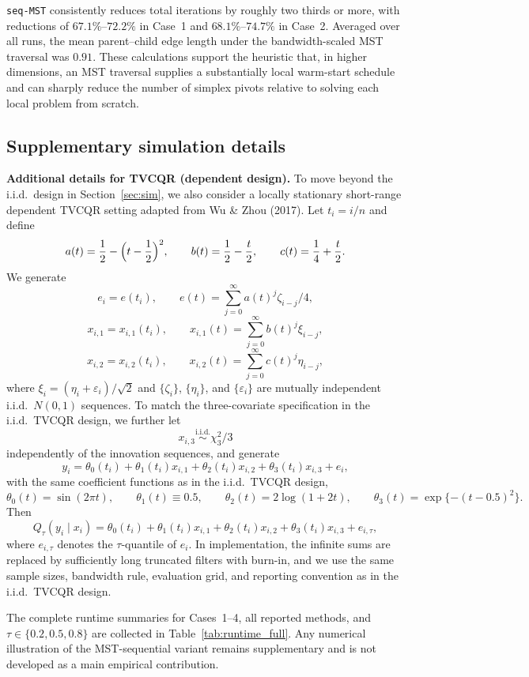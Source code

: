 \documentclass[lineno]{biometrika}
\begin{document}
\texttt{seq-MST} consistently reduces total iterations by roughly two thirds or more, with reductions of
$67.1\%$--$72.2\%$ in Case~1 and $68.1\%$--$74.7\%$ in Case~2. Averaged over all runs, the mean parent--child edge
length under the bandwidth-scaled MST traversal was $0.91$. These calculations support the heuristic that, in higher
dimensions, an MST traversal supplies a substantially local warm-start schedule and can sharply reduce the number of
simplex pivots relative to solving each local problem from scratch.

\subsection{Supplementary simulation details}\label{app:supplement}

\noindent\textbf{Additional details for TVCQR (dependent design).}
To move beyond the i.i.d.\ design in Section~\ref{sec:sim}, we also consider a locally stationary short-range
dependent TVCQR setting adapted from Wu \& Zhou (2017). Let $t_i=i/n$ and define
\[
a(t)=\frac{1}{2}-\Bigl(t-\frac{1}{2}\Bigr)^2,\qquad
b(t)=\frac{1}{2}-\frac{t}{2},\qquad
c(t)=\frac{1}{4}+\frac{t}{2}.
\]
We generate
\[
e_i=e(t_i),\qquad e(t)=\sum_{j=0}^\infty a(t)^j\zeta_{i-j}/4,
\]
\[
x_{i,1}=x_{i,1}(t_i),\qquad x_{i,1}(t)=\sum_{j=0}^\infty b(t)^j\xi_{i-j},
\]
\[
x_{i,2}=x_{i,2}(t_i),\qquad x_{i,2}(t)=\sum_{j=0}^\infty c(t)^j\eta_{i-j},
\]
where $\xi_i=(\eta_i+\varepsilon_i)/\sqrt{2}$ and $\{\zeta_i\}$, $\{\eta_i\}$, and $\{\varepsilon_i\}$ are mutually
independent i.i.d.\ $N(0,1)$ sequences. To match the three-covariate specification in the i.i.d.\ TVCQR design, we further let
\[
x_{i,3}\stackrel{\mathrm{i.i.d.}}{\sim}\chi_3^2/3
\]
independently of the innovation sequences, and generate
\[
y_i=\theta_0(t_i)+\theta_1(t_i)x_{i,1}+\theta_2(t_i)x_{i,2}+\theta_3(t_i)x_{i,3}+e_i,
\]
with the same coefficient functions as in the i.i.d.\ TVCQR design,
\[
\theta_0(t)=\sin(2\pi t),\qquad
\theta_1(t)\equiv 0.5,\qquad
\theta_2(t)=2\log(1+2t),\qquad
\theta_3(t)=\exp\{-(t-0.5)^2\}.
\]
Then
\[
Q_\tau(y_i\mid x_i)=\theta_0(t_i)+\theta_1(t_i)x_{i,1}+\theta_2(t_i)x_{i,2}+\theta_3(t_i)x_{i,3}+e_{i,\tau},
\]
where $e_{i,\tau}$ denotes the $\tau$-quantile of $e_i$. In implementation, the infinite sums are replaced by
sufficiently long truncated filters with burn-in, and we use the same sample sizes, bandwidth rule, evaluation grid,
and reporting convention as in the i.i.d.\ TVCQR design.

The complete runtime summaries for Cases~1--4, all reported methods, and $\tau\in\{0.2,0.5,0.8\}$ are collected in
Table~\ref{tab:runtime_full}. Any numerical illustration of the MST-sequential variant remains supplementary and is not
developed as a main empirical contribution.
\end{document}
